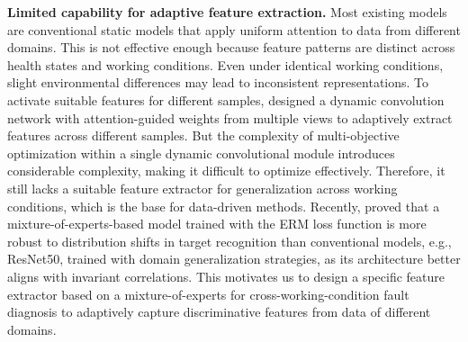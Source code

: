 \documentclass{article}
\begin{document}
	\textbf{Limited capability for adaptive feature extraction.} Most existing models are conventional static models that apply uniform attention to data from different domains. This is not effective enough because feature patterns are distinct across health states and working conditions. Even under identical working conditions, slight environmental differences may lead to inconsistent representations. To activate suitable features for different samples, \cite{RN5} designed a dynamic convolution network with attention-guided weights from multiple views to adaptively extract features across different samples. But the complexity of multi-objective optimization within a single dynamic convolutional module introduces considerable complexity, making it difficult to optimize effectively. Therefore, it still lacks a suitable feature extractor for generalization across working conditions, which is the base for data-driven methods. Recently, \cite{RN7} proved that a mixture-of-experts-based model trained with the ERM loss function is more robust to distribution shifts in target recognition than conventional models, e.g., ResNet50, trained with domain generalization strategies, as its architecture better aligns with invariant correlations. This motivates us to design a specific feature extractor based on a mixture-of-experts for cross-working-condition fault diagnosis to adaptively capture discriminative features from data of different domains.
	
\end{document}

